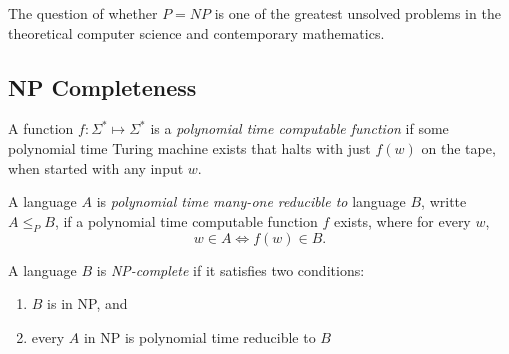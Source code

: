 \documentclass[11pt]{article}
\begin{document}
The question of whether $P = NP$ is one of the greatest unsolved problems in the theoretical
computer science and contemporary mathematics.

\subsection{NP Completeness}

\begin{definition}
A function $f: \Sigma^\ast \mapsto \Sigma^\ast$ is a \emph{polynomial time computable function} if
some polynomial time Turing machine exists that halts with just $f(w)$ on the tape, when started
with any input $w$.
\end{definition}

\begin{definition}
A language $A$ is \emph{polynomial time many-one reducible to} language $B$, writte $A \leq_P B$,
if a polynomial time computable function $f$ exists, where for every $w$,
\[
  w \in A \Leftrightarrow f(w) \in B.
\]
\end{definition}

\begin{definition}
A language $B$ is \emph{NP-complete} if it satisfies two conditions:
\begin{enumerate}
\item $B$ is in NP, and
\item every $A$ in NP is polynomial time reducible to $B$
\end{enumerate}
\end{definition}
\end{document}
